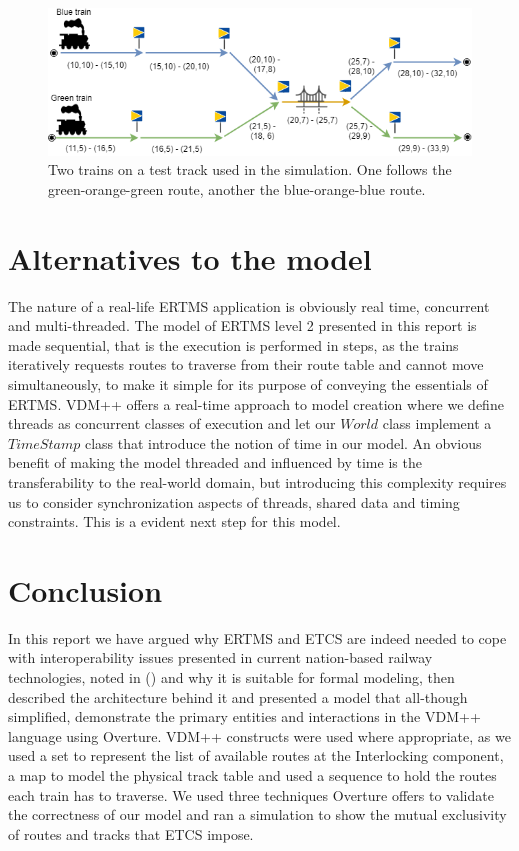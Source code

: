 \documentclass[preprint,12pt]{elsarticle}
\begin{document}
\begin{figure}[h]
	\centering
	\includegraphics[width=0.8\linewidth]{TrainTrack.png}
	\caption{Two trains on a test track used in the simulation. One follows the green-orange-green route, another the blue-orange-blue route.}
	\label{fig:testtrack}
\end{figure}

\section{Alternatives to the model}

The nature of a real-life ERTMS application is obviously real time, concurrent and multi-threaded. The model of ERTMS level 2 presented in this report is made sequential, that is the execution is performed in steps, as the trains iteratively requests routes to traverse from their route table and cannot move simultaneously, to make it simple for its purpose of conveying the essentials of ERTMS. VDM++ offers a real-time approach to model creation where we define threads as concurrent classes of execution and let our $World$ class implement a $TimeStamp$ class that introduce the notion of time in our model. An obvious benefit of making the model threaded and influenced by time is the transferability to the real-world domain, but introducing this complexity requires us to consider synchronization aspects of threads, shared data and timing constraints. This is a evident next step for this model.

\section{Conclusion}

In this report we have argued why ERTMS and ETCS are indeed needed to cope with interoperability issues presented in current nation-based railway technologies, noted in (\citet{Commission2018}) and why it is suitable for formal modeling, then described the architecture behind it and presented a model that all-though simplified, demonstrate the primary entities and interactions in the VDM++ language using Overture. VDM++ constructs were used where appropriate, as we used a set to represent the list of available routes at the Interlocking component, a map to model the physical track table and used a sequence to hold the routes each train has to traverse. We used three techniques Overture offers to validate the correctness of our model and ran a simulation to show the mutual exclusivity of routes and tracks that ETCS impose.
\end{document}
